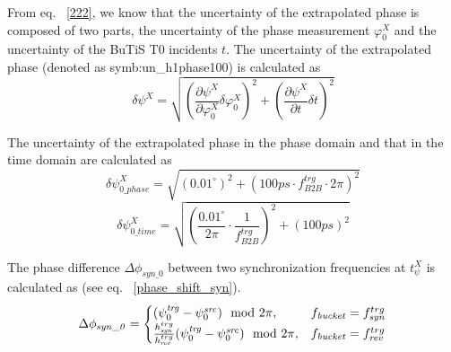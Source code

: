 From eq. ~\ref{222}, we know that the uncertainty of the extrapolated phase is composed of two parts, the uncertainty of the phase measurement $\varphi^X_0$ and the uncertainty of the BuTiS T0 incidents $t$. The uncertainty of the extrapolated phase (denoted as \gls{symb:un_h1phase100}) is calculated as 
\begin{equation} 
\delta \psi^{X}=\sqrt{(\frac {\partial \psi^{X}}{\partial \varphi^X_0}\delta  \varphi^X_0)^2+(\frac {\partial \psi^{X}}{\partial t}\delta t)^2 }
\end{equation}

The uncertainty of the extrapolated phase in the phase domain and that in the time domain are calculated as 
\begin{equation} 
\delta \psi^{X}_\mathit{0\_phase}=\sqrt{(0.01^\circ)^2+(100ps \cdot f_\mathit{B2B}^\mathit{trg} \cdot {2\pi})^2}
\label{jitter_measure_p}
\end{equation}
\begin{equation} 
\delta \psi^{X}_\mathit{0\_time}=\sqrt{(\frac{0.01^\circ}{2\pi}\cdot \frac{1}{f_\mathit{B2B}^\mathit{trg}})^2+(100ps)^2} 
\label{jitter_measure_p}
\end{equation}

The phase difference $\Delta \phi_\mathit{syn\_0}$ between two synchronization frequencies at $t_\psi^X$ is calculated as (see eq. ~\ref{phase_shift_syn}).
\begin{eqnarray}\label{phase_syn}
\Delta \phi_\mathit{syn\_0}=
\begin{cases}
(\psi^\mathit{trg}_0-\psi^\mathit{src}_0) \mod 2\pi, &f_{\mathit{bucket}}=f_{\mathit{syn}}^{trg}\cr
\frac{h_{\mathit{syn}}^{trg}}{h_{\mathit{rev}}^{trg}}(\psi^\mathit{trg}_0-\psi^\mathit{src}_0) \mod 2\pi, &f_{\mathit{bucket}}=f_{\mathit{rev}}^{trg}\cr
\end{cases}
\end{eqnarray}


